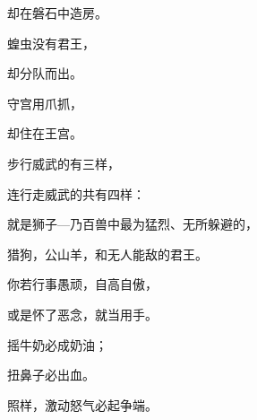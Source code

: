 {\par }{\Q 却在磐石中造房。
\par }{\Q {}蝗虫没有君王，
\par }{\Q 却分队而出。
\par }{\Q {}守宫用爪抓{}，
\par }{\Q 却住在王宫。
\par }{\BB \par }{\Q {}步行威武的有三样，
\par }{\Q 连行走威武的共有四样：
\par }{\Q {}就是狮子—乃百兽中最为猛烈、无所躲避的，
\par }{\Q {}猎狗，公山羊，和无人能敌的君王。
\par }{\BB \par }{\Q {}你若行事愚顽，自高自傲，
\par }{\Q 或是怀了恶念，就当用手{}。
\par }{\Q {}摇牛奶必成奶油；
\par }{\Q 扭鼻子必出血。
\par }{\Q 照样，激动怒气必起争端。

}
